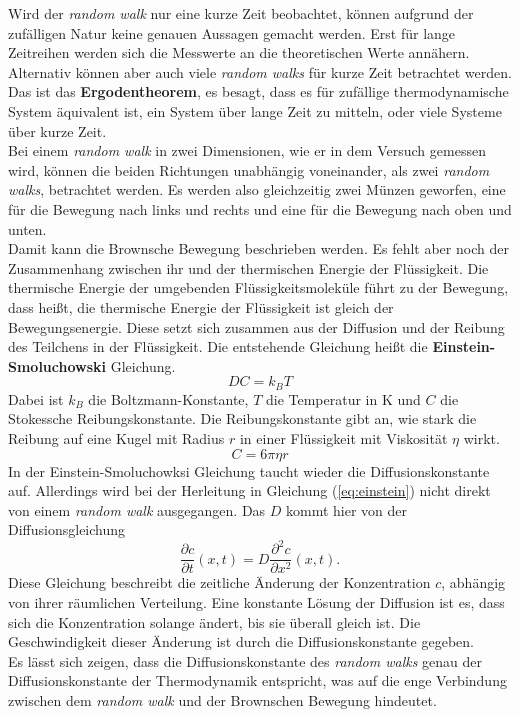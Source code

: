 Wird der \emph{random walk} nur eine kurze Zeit beobachtet, können aufgrund der zufälligen Natur keine genauen Aussagen gemacht werden. Erst für lange Zeitreihen werden sich die Messwerte an die theoretischen Werte annähern. Alternativ können aber auch viele \emph{random walks} für kurze Zeit betrachtet werden. Das ist das \textbf{Ergodentheorem}, es besagt, dass es für zufällige thermodynamische System äquivalent ist, ein System über lange Zeit zu mitteln, oder viele Systeme über kurze Zeit.\\
Bei einem \emph{random walk} in zwei Dimensionen, wie er in dem Versuch gemessen wird, können die beiden Richtungen unabhängig voneinander, als zwei \emph{random walks}, betrachtet werden. Es werden also gleichzeitig zwei Münzen geworfen, eine für die Bewegung nach links und rechts und eine für die Bewegung nach oben und unten.\\


Damit kann die Brownsche Bewegung beschrieben werden. Es fehlt aber noch der Zusammenhang zwischen ihr und der thermischen Energie der Flüssigkeit. Die thermische Energie der umgebenden Flüssigkeitsmoleküle führt zu der Bewegung, dass heißt, die thermische Energie der Flüssigkeit ist gleich der Bewegungsenergie. Diese setzt sich zusammen aus der Diffusion und der Reibung des Teilchens in der Flüssigkeit. Die entstehende Gleichung heißt die  \textbf{Einstein-Smoluchowski} Gleichung.
\begin{equation}
  D C = k_B T \label{eq:einstein}
\end{equation}
Dabei ist $k_B$ die Boltzmann-Konstante, $T$ die Temperatur in K und $C$ die Stokessche Reibungskonstante. Die Reibungskonstante gibt an, wie stark die Reibung auf eine Kugel mit Radius $r$ in einer Flüssigkeit mit Viskosität $\eta$ wirkt.
\begin{equation}
  C = 6 \pi \eta r
\end{equation}
In der Einstein-Smoluchowksi Gleichung taucht wieder die Diffusionskonstante auf. Allerdings wird bei der Herleitung in Gleichung (\ref{eq:einstein}) nicht direkt von einem \emph{random walk} ausgegangen. Das $D$ kommt hier von der Diffusionsgleichung
\begin{equation}
  \frac{\partial c}{\partial t}(x, t) = D \frac{\partial^2 c}{\partial x^2} (x, t). \label{eq:diffusion}
\end{equation}
Diese Gleichung beschreibt die zeitliche Änderung der Konzentration $c$, abhängig von ihrer räumlichen Verteilung. Eine konstante Lösung der Diffusion ist es, dass sich die Konzentration solange ändert, bis sie überall gleich ist. Die Geschwindigkeit dieser Änderung ist durch die Diffusionskonstante gegeben.\\
Es lässt sich zeigen, dass die Diffusionskonstante des \emph{random walks} genau der Diffusionskonstante der Thermodynamik entspricht, was auf die enge Verbindung zwischen dem \emph{random walk} und der Brownschen Bewegung hindeutet.
